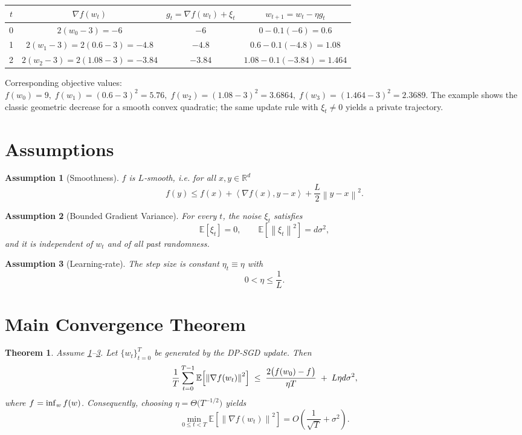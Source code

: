 \documentclass{article}
\newtheorem{theorem}{Theorem}
\newtheorem{assumption}{Assumption}
\newcommand{\EE}{\mathbb{E}}
\newcommand{\RR}{\mathbb{R}}
\newcommand{\norm}[1]{\left\lVert #1\right\rVert}
\newcommand{\inner}[2]{\left\langle #1,#2\right\rangle}
\begin{document}
\begin{center}
\begin{tabular}{c|c|c|c}
$t$ & $\nabla f(w_{t})$ & $g_{t}= \nabla f(w_{t})+\xi_{t}$ & $w_{t+1}=w_{t}-\eta g_{t}$ \\ \hline
0 & $2(w_{0}-3)=-6$ & $-6$ & $0-0.1(-6)=0.6$ \\[4pt]
1 & $2(w_{1}-3)=2(0.6-3)=-4.8$ & $-4.8$ & $0.6-0.1(-4.8)=1.08$ \\[4pt]
2 & $2(w_{2}-3)=2(1.08-3)=-3.84$ & $-3.84$ & $1.08-0.1(-3.84)=1.464$ 
\end{tabular}
\end{center}
Corresponding objective values:
$f(w_{0})=9,\;f(w_{1})=(0.6-3)^{2}=5.76,\;f(w_{2})=(1.08-3)^{2}=3.6864,\;f(w_{3})=(1.464-3)^{2}=2.3689.$
The example shows the classic geometric decrease for a smooth convex quadratic; the same update rule with $\xi_{t}\neq0$ yields a private trajectory.

\newpage
\section*{Assumptions}
\begin{assumption}[Smoothness]\label{ass:smooth}
$f$ is $L$‑smooth, i.e. for all $x,y\in\RR^{d}$
\[
f(y)\le f(x)+\inner{\nabla f(x)}{y-x}+\frac{L}{2}\norm{y-x}^{2}.
\]
\end{assumption}
\begin{assumption}[Bounded Gradient Variance]\label{ass:var}
For every $t$, the noise $\xi_{t}$ satisfies
\[
\EE[\xi_{t}]=0,\qquad \EE[\norm{\xi_{t}}^{2}]=d\sigma^{2},
\]
and it is independent of $w_{t}$ and of all past randomness.
\end{assumption}
\begin{assumption}[Learning‑rate]\label{ass:lr}
The step size is constant $\eta_{t}\equiv\eta$ with 
\[
0<\eta\le\frac{1}{L}.
\]
\end{assumption}

\section*{Main Convergence Theorem}
\begin{theorem}\label{thm:main}
Assume \ref{ass:smooth}–\ref{ass:lr}. Let $\{w_{t}\}_{t=0}^{T}$ be generated by the DP‑SGD update. Then
\[
\frac{1}{T}\sum_{t=0}^{T-1}\EE\!\left[\norm{\nabla f(w_{t})}^{2}\right]
\;\le\;
\frac{2\bigl(f(w_{0})-f^{\*}\bigr)}{\eta T}
\;+\;
L\eta d\sigma^{2},
\]
where $f^{\*}=\inf_{w}f(w)$. Consequently, choosing $\eta = \Theta\!\bigl(T^{-1/2}\bigr)$ yields
\[
\min_{0\le t<T}\EE\!\left[\norm{\nabla f(w_{t})}^{2}\right]=O\!\left(\frac{1}{\sqrt{T}}+ \sigma^{2}\right).
\]
\end{theorem}
\end{document}
